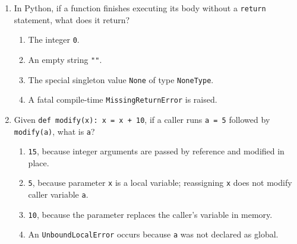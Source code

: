\documentclass[11pt,a4paper]{article}
\begin{document}
\begin{enumerate}[label=\textbf{Q\arabic*.},leftmargin=2em,itemsep=1pt,topsep=1pt]
\item In Python, if a function finishes executing its body without a \texttt{return} statement, what does it return?
\begin{enumerate}[label=\Alph*.,leftmargin=2em]
  \item The integer \texttt{0}.
  \item An empty string \texttt{""}.
  \item The special singleton value \texttt{None} of type \texttt{NoneType}.
  \item A fatal compile-time \texttt{MissingReturnError} is raised.
\end{enumerate}

\item Given \texttt{def modify(x): x = x + 10}, if a caller runs \texttt{a = 5} followed by \texttt{modify(a)}, what is \texttt{a}?
\begin{enumerate}[label=\Alph*.,leftmargin=2em]
  \item \texttt{15}, because integer arguments are passed by reference and modified in place.
  \item \texttt{5}, because parameter \texttt{x} is a local variable; reassigning \texttt{x} does not modify caller variable \texttt{a}.
  \item \texttt{10}, because the parameter replaces the caller's variable in memory.
  \item An \texttt{UnboundLocalError} occurs because \texttt{a} was not declared as global.
\end{enumerate}

\end{enumerate}

\newpage

\end{document}
